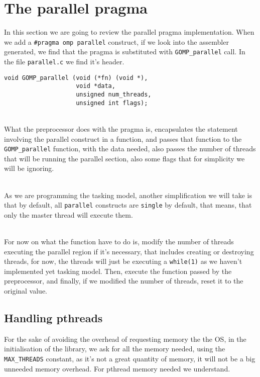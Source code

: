 
\section{The parallel pragma}
In this section we are going to review the parallel pragma implementation. When we add a \texttt{\#pragma omp parallel} construct, if we look into the assembler generated, we find that the pragma is substituted with \texttt{GOMP\_parallel} call. In the file \texttt{parallel.c} we find it's header.

\begin{lstlisting}[caption=Header for GOMP\_parallel function, label=GOMPparallel]
void GOMP_parallel (void (*fn) (void *), 
                    void *data, 
                    unsigned num_threads, 
                    unsigned int flags);
\end{lstlisting}

\par ~\\
What the preprocessor does with the pragma is, encapsulates the statement involving the parallel construct in a function, and passes that function to the \texttt{GOMP\_parallel} function, with the data needed, also passes the number of threads that will be running the parallel section, also some flags that for simplicity we will be ignoring.

\par ~\\
As we are programming the tasking model, another simplification we will take is that by default, all \texttt{parallel} constructs are \texttt{single} by default, that means, that only the master thread will execute them. 

\par ~\\
For now on what the function have to do is, modify the number of threads executing the parallel region if it's necessary, that includes creating or destroying threads, for now, the threads will just be executing a \texttt{while(1)} as we haven't implemented yet tasking model. Then, execute the function passed by the preprocessor, and finally, if we modified the number of threads, reset it to the original value.

\subsection{Handling pthreads}
For the sake of avoiding the overhead of requesting memory the the OS, in the initialisation of the library, we ask for all the memory needed, using the \texttt{MAX\_THREADS} constant, as it's not a great quantity of memory, it will not be a big unneeded memory overhead. For pthread memory needed we understand.

